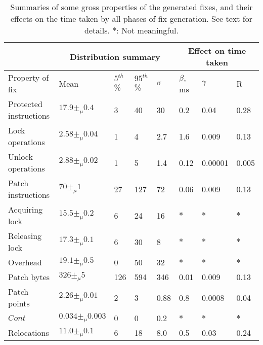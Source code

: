 \begin{table}
  \begin{tabular}{|l|l|l|l|l|l|l|l|}
    \hline
                           & \multicolumn{4}{c|}{Distribution summary} & \multicolumn{3}{c|}{Effect on time taken} \\
    \hline
    Property of fix        & Mean & $5^{th}$\% & $95^{th}$\% & $\sigma$ & $\beta$, ms & $\gamma$ & R\\
    \hline
    Protected instructions & $17.9 \pm_\mu 0.4$  & 3   & 40  & 30  & 0.2  & 0.04 & 0.28 \\
    Lock operations        & $2.58 \pm_\mu 0.04$ & 1   & 4   & 2.7 & 1.6  & 0.009& 0.13 \\
    Unlock operations      & $2.88 \pm_\mu 0.02$ & 1   & 5   & 1.4 & 0.12 & 0.00001& 0.005 \\
    Patch instructions     & $70 \pm_\mu 1$      & 27  & 127 & 72  & 0.06 & 0.009& 0.13\\
    \hspace{5mm}Acquiring lock&$15.5 \pm_\mu 0.2$& 6   & 24  & 16  &$\ast$&$\ast$& $\ast$\\
    \hspace{5mm}Releasing lock&$17.3 \pm_\mu 0.1$& 6   & 30  & 8   &$\ast$&$\ast$& $\ast$\\
    \hspace{5mm}Overhead   & $19.1 \pm_\mu 0.5$  & 0   & 50  & 32  &$\ast$&$\ast$& $\ast$\\
    Patch bytes            & $326 \pm_\mu 5$     & 126 & 594 & 346 & 0.01 & 0.009& 0.13\\
    Patch points           & $2.26 \pm_\mu 0.01$ & 2   & 3   & 0.88& 0.8  & 0.0008& 0.04\\
    $\mathit{Cont}$        &$0.034 \pm_\mu 0.003$& 0   & 0   & 0.2 &$\ast$&$\ast$& $\ast$\\
    Relocations            & $11.0 \pm_\mu 0.1$  & 6   & 18  & 8.0 & 0.5  & 0.03 & 0.24\\
    \hline
  \end{tabular}
  \caption{Summaries of some gross properties of the generated fixes,
    and their effects on the time taken by all phases of fix
    generation.  See text for details. $\ast$: Not meaningful.}
  \label{tab:eval:gen_fix_perf:props}
\end{table}


